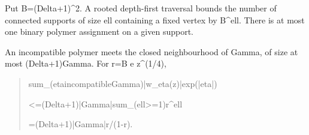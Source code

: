 \documentclass[
]{article}
\begin{document}
Put B=(Delta+1)\^{}2. A rooted depth-first traversal bounds the number
of connected supports of size ell containing a fixed vertex by B\^{}ell.
There is at most one binary polymer assignment on a given support.

An incompatible polymer meets the closed neighbourhood of Gamma, of size
at most (Delta+1)\textbar Gamma\textbar. For r=B e
\textbar z\textbar\^{}(1/4),

\begin{quote}\small\ttfamily\raggedright\setlength{\parskip}{0pt}
\noindent s\allowbreak{}u\allowbreak{}m\allowbreak{}\_\allowbreak{}(\allowbreak{}e\allowbreak{}t\allowbreak{}a\allowbreak{}\hspace*{0.525em}\allowbreak{}i\allowbreak{}n\allowbreak{}c\allowbreak{}o\allowbreak{}m\allowbreak{}p\allowbreak{}a\allowbreak{}t\allowbreak{}i\allowbreak{}b\allowbreak{}l\allowbreak{}e\allowbreak{}\hspace*{0.525em}\allowbreak{}G\allowbreak{}a\allowbreak{}m\allowbreak{}m\allowbreak{}a\allowbreak{})\allowbreak{}\hspace*{0.525em}\allowbreak{}|\allowbreak{}w\allowbreak{}\_\allowbreak{}e\allowbreak{}t\allowbreak{}a\allowbreak{}(\allowbreak{}z\allowbreak{})\allowbreak{}|\allowbreak{}\hspace*{0.525em}\allowbreak{}e\allowbreak{}x\allowbreak{}p\allowbreak{}(\allowbreak{}|\allowbreak{}e\allowbreak{}t\allowbreak{}a\allowbreak{}|\allowbreak{})\par
\noindent \hspace*{0.525em}\allowbreak{}\hspace*{0.525em}\allowbreak{}\hspace*{0.525em}\allowbreak{}<\allowbreak{}=\allowbreak{}\hspace*{0.525em}\allowbreak{}(\allowbreak{}D\allowbreak{}e\allowbreak{}l\allowbreak{}t\allowbreak{}a\allowbreak{}+\allowbreak{}1\allowbreak{})\allowbreak{}|\allowbreak{}G\allowbreak{}a\allowbreak{}m\allowbreak{}m\allowbreak{}a\allowbreak{}|\allowbreak{}\hspace*{0.525em}\allowbreak{}s\allowbreak{}u\allowbreak{}m\allowbreak{}\_\allowbreak{}(\allowbreak{}e\allowbreak{}l\allowbreak{}l\allowbreak{}>\allowbreak{}=\allowbreak{}1\allowbreak{})\allowbreak{}\hspace*{0.525em}\allowbreak{}r\allowbreak{}\^{}\allowbreak{}e\allowbreak{}l\allowbreak{}l\par
\noindent \hspace*{0.525em}\allowbreak{}\hspace*{0.525em}\allowbreak{}\hspace*{0.525em}\allowbreak{}=\allowbreak{}\hspace*{0.525em}\allowbreak{}(\allowbreak{}D\allowbreak{}e\allowbreak{}l\allowbreak{}t\allowbreak{}a\allowbreak{}+\allowbreak{}1\allowbreak{})\allowbreak{}|\allowbreak{}G\allowbreak{}a\allowbreak{}m\allowbreak{}m\allowbreak{}a\allowbreak{}|\allowbreak{}\hspace*{0.525em}\allowbreak{}r\allowbreak{}/\allowbreak{}(\allowbreak{}1\allowbreak{}-\allowbreak{}r\allowbreak{})\allowbreak{}.\par
\end{quote}
\end{document}
